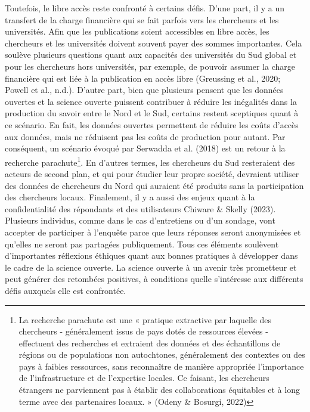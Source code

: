 \documentclass[
  letterpaper,
  DIV=11,
  numbers=noendperiod]{scrreprt}
\begin{document}
Toutefois, le libre accès reste confronté à certains défis. D'une part,
il y a un transfert de la charge financière qui se fait parfois vers les
chercheurs et les universités. Afin que les publications soient
accessibles en libre accès, les chercheurs et les universités doivent
souvent payer des sommes importantes. Cela soulève plusieurs questions
quant aux capacités des universités du Sud global et pour les chercheurs
hors universités, par exemple, de pouvoir assumer la charge financière
qui est liée à la publication en accès libre (Greussing et al., 2020;
Powell et al., n.d.). D'autre part, bien que plusieurs pensent que les
données ouvertes et la science ouverte puissent contribuer à réduire les
inégalités dans la production du savoir entre le Nord et le Sud,
certains restent sceptiques quant à ce scénario. En fait, les données
ouvertes permettent de réduire les coûts d'accès aux données, mais ne
réduisent pas les coûts de production pour autant. Par conséquent, un
scénario évoqué par Serwadda et al. (2018) est un retour à la recherche
parachute\footnote{La recherche parachute est une « pratique extractive
  par laquelle des chercheurs - généralement issus de pays dotés de
  ressources élevées - effectuent des recherches et extraient des
  données et des échantillons de régions ou de populations non
  autochtones, généralement des contextes ou des pays à faibles
  ressources, sans reconnaître de manière appropriée l'importance de
  l'infrastructure et de l'expertise locales. Ce faisant, les chercheurs
  étrangers ne parviennent pas à établir des collaborations équitables
  et à long terme avec des partenaires locaux. » (Odeny \& Bosurgi,
  2022)}. En d'autres termes, les chercheurs du Sud resteraient des
acteurs de second plan, et qui pour étudier leur propre société,
devraient utiliser des données de chercheurs du Nord qui auraient été
produits sans la participation des chercheurs locaux. Finalement, il y a
aussi des enjeux quant à la confidentialité des répondants et des
utilisateurs Chiware \& Skelly (2023). Plusieurs individus, comme dans
le cas d'entretiens ou d'un sondage, vont accepter de participer à
l'enquête parce que leurs réponses seront anonymisées et qu'elles ne
seront pas partagées publiquement. Tous ces éléments soulèvent
d'importantes réflexions éthiques quant aux bonnes pratiques à
développer dans le cadre de la science ouverte. La science ouverte à un
avenir très prometteur et peut générer des retombées positives, à
conditions quelle s'intéresse aux différents défis auxquels elle est
confrontée.
\end{document}
